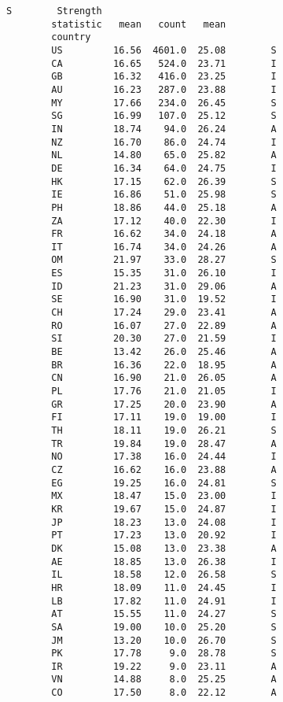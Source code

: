 \documentclass[11pt]{article}
\begin{document}
\begin{Verbatim}[commandchars=\\\{\}]
                               S        Strength  
        statistic   mean   count   mean           
        country                                   
        US         16.56  4601.0  25.08        S  
        CA         16.65   524.0  23.71        I  
        GB         16.32   416.0  23.25        I  
        AU         16.23   287.0  23.88        I  
        MY         17.66   234.0  26.45        S  
        SG         16.99   107.0  25.12        S  
        IN         18.74    94.0  26.24        A  
        NZ         16.70    86.0  24.74        I  
        NL         14.80    65.0  25.82        A  
        DE         16.34    64.0  24.75        I  
        HK         17.15    62.0  26.39        S  
        IE         16.86    51.0  25.98        S  
        PH         18.86    44.0  25.18        A  
        ZA         17.12    40.0  22.30        I  
        FR         16.62    34.0  24.18        A  
        IT         16.74    34.0  24.26        A  
        OM         21.97    33.0  28.27        S  
        ES         15.35    31.0  26.10        I  
        ID         21.23    31.0  29.06        A  
        SE         16.90    31.0  19.52        I  
        CH         17.24    29.0  23.41        A  
        RO         16.07    27.0  22.89        A  
        SI         20.30    27.0  21.59        I  
        BE         13.42    26.0  25.46        A  
        BR         16.36    22.0  18.95        A  
        CN         16.90    21.0  26.05        A  
        PL         17.76    21.0  21.05        I  
        GR         17.25    20.0  23.90        A  
        FI         17.11    19.0  19.00        I  
        TH         18.11    19.0  26.21        S  
        TR         19.84    19.0  28.47        A  
        NO         17.38    16.0  24.44        I  
        CZ         16.62    16.0  23.88        A  
        EG         19.25    16.0  24.81        S  
        MX         18.47    15.0  23.00        I  
        KR         19.67    15.0  24.87        I  
        JP         18.23    13.0  24.08        I  
        PT         17.23    13.0  20.92        I  
        DK         15.08    13.0  23.38        A  
        AE         18.85    13.0  26.38        I  
        IL         18.58    12.0  26.58        S  
        HR         18.09    11.0  24.45        I  
        LB         17.82    11.0  24.91        I  
        AT         15.55    11.0  24.27        S  
        SA         19.00    10.0  25.20        S  
        JM         13.20    10.0  26.70        S  
        PK         17.78     9.0  28.78        S  
        IR         19.22     9.0  23.11        A  
        VN         14.88     8.0  25.25        A  
        CO         17.50     8.0  22.12        A  
\end{Verbatim}
        
\end{document}
